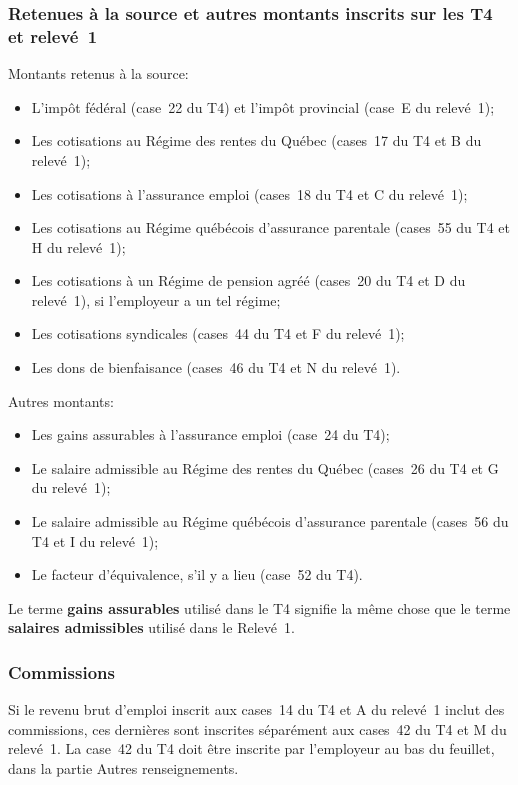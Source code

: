 \subsubsection{Retenues à la source et autres montants inscrits sur les T4 et relevé~1}
Montants retenus à la source:
\begin{itemize}
	\item L'impôt fédéral (case~22 du T4) et l'impôt provincial (case~E du relevé~1);
	\item Les cotisations au Régime des rentes du Québec (cases~17 du T4 et B du relevé~1);
	\item Les cotisations à l'assurance emploi (cases~18 du T4 et C du relevé~1);
	\item Les cotisations au Régime québécois d'assurance parentale (cases~55 du T4 et H du relevé~1);
	\item Les cotisations à un Régime de pension agréé (cases~20 du T4 et D du relevé~1), si l'employeur a un tel régime;
	\item Les cotisations syndicales (cases~44 du T4 et F du relevé~1);
	\item Les dons de bienfaisance (cases~46 du T4 et N du relevé~1).
\end{itemize}

Autres montants:
\begin{itemize}
	\item Les gains assurables à l'assurance emploi (case~24 du T4);
	\item Le salaire admissible au Régime des rentes du Québec (cases~26 du T4 et G du relevé~1);
	\item Le salaire admissible au Régime québécois d'assurance parentale (cases~56 du T4 et I du relevé~1);
	\item Le facteur d'équivalence, s'il y a lieu (case~52 du T4).
\end{itemize}

Le terme \textbf{gains assurables} utilisé dans le T4 signifie la même chose que le terme \textbf{salaires admissibles} utilisé dans le Relevé~1.

\subsubsection{Commissions}
Si le revenu brut d'emploi inscrit aux cases~14 du T4 et A du relevé~1 inclut des commissions, ces dernières sont inscrites séparément aux cases~42 du T4 et M du relevé~1. La case~42 du T4 doit être inscrite par l'employeur au bas du feuillet, dans la partie \og Autres renseignements\fg{}.


